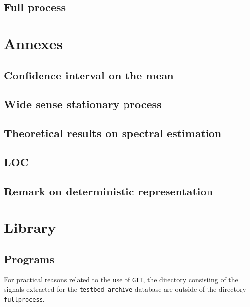 \documentclass[a4paper, 12pt]{report}
\begin{document}
\chapter{Full process}
\label{chap:fullprocess}


\part{Annexes}
\chapter{Confidence interval on the mean}

\chapter{Wide sense stationary process}
\label{ann:wss}

\chapter{Theoretical results on spectral estimation}
\label{ann:spectral-estimation}
 
\chapter{LOC}
 
\chapter{Remark on deterministic representation}
 

\part{Library}
\chapter{Programs}
For practical reasons related to the use of {\tt GIT}, the directory consisting of the signals extracted for the {\tt testbed\_archive} database are outside of the directory {\tt fullprocess}. 

 



\end{document}
